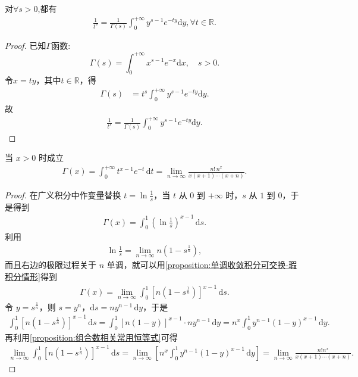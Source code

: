 \documentclass[../../main.tex]{subfiles}%
\begin{document}
\begin{proposition}\label{proposition:分式化积分-Gamma函数相关性质}
对$\forall s>0$,都有
\begin{align}\label{euqation:将分式化成积分形式}
\frac{1}{t^s}=\frac{1}{\Gamma \left( s \right)}\int_0^{+\infty}{y^{s-1}e^{-ty}\mathrm{d}y},\forall t\in \mathbb{R}.
\end{align}
\end{proposition}
\begin{proof}
已知$\Gamma $函数:\[\Gamma \left( s \right) =\int_0^{+\infty}{x^{s-1}e^{-x}\mathrm{d}x},\quad s>0.\]
令$x=ty$，其中$t\in \mathbb{R}$，得
\begin{align*}
\Gamma \left( s \right) &= t^s\int_0^{+\infty}{y^{s-1}e^{-ty}\mathrm{d}y} .
\end{align*}
故
\begin{align*}
\frac{1}{t^s}=\frac{1}{\Gamma \left( s \right)}\int_0^{+\infty}{y^{s-1}e^{-ty}\mathrm{d}y}.
\end{align*}
\end{proof}

\begin{proposition}
当 $x>0$ 时成立
\begin{align*}
\Gamma(x)=\int_0^{+\infty} t^{x-1} e^{-t}\,\mathrm{d}t=\lim_{n\to\infty}\frac{n!\,n^x}{x(x+1)\cdots(x+n)}.
\end{align*}
\end{proposition}
\begin{proof}
在广义积分中作变量替换 $t=\ln \frac{1}{s}$，当 $t$ 从 $0$ 到 $+\infty$ 时，$s$ 从 $1$ 到 $0$，于是得到
\begin{align*}
\Gamma(x)=\int_0^1 \left(\ln \frac{1}{s}\right)^{x-1}\,\mathrm{d}s.
\end{align*}
利用
\begin{align*}
\ln \frac{1}{s}=\lim_{n\to\infty} n\left(1-s^{\frac{1}{n}}\right),
\end{align*}
而且右边的极限过程关于 $n$ 单调，就可以用\cref{proposition:单调收敛积分可交换-瑕积分情形}得到
\begin{align*}
\Gamma(x)=\lim_{n\to\infty}\int_0^1 \left[n\left(1-s^{\frac{1}{n}}\right)\right]^{x-1}\,\mathrm{d}s.
\end{align*}
令 $y=s^{\frac{1}{n}}$，则 $s=y^n$，$\mathrm{d}s=n y^{n-1}\,\mathrm{d}y$，于是
\begin{align*}
\int_0^1 \left[n\left(1-s^{\frac{1}{n}}\right)\right]^{x-1}\,\mathrm{d}s
= \int_0^1 \left[n(1-y)\right]^{x-1} \cdot n y^{n-1}\,\mathrm{d}y 
= n^x \int_0^1 y^{n-1}(1-y)^{x-1}\,\mathrm{d}y.
\end{align*}
再利用\cref{proposition:组合数相关常用恒等式}可得
\begin{align*}
\underset{n\rightarrow \infty}{\lim}\int_0^1{\left[ n\left( 1-s^{\frac{1}{n}} \right) \right] ^{x-1}\,\mathrm{d}s}=\underset{n\rightarrow \infty}{\lim}\left[ n^x\int_0^1{y^{n-1}\left( 1-y \right) ^{x-1}\,\mathrm{d}y} \right] =\underset{n\rightarrow \infty}{\lim}\frac{n!n^x}{x\left( x+1 \right) \cdots \left( x+n \right)}.
\end{align*}
\end{proof}
\end{document}
